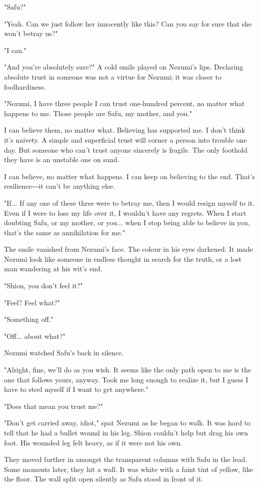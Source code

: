 "Safu?"

"Yeah. Can we just follow her innocently like this? Can you say for sure
that she won't betray us?"

"I can."

"And you're absolutely sure?" A cold smile played on Nezumi's lips.
Declaring absolute trust in someone was not a virtue for Nezumi; it was
closer to foolhardiness.

"Nezumi, I have three people I can trust one-hundred percent, no matter
what happens to me. Those people are Safu, my mother, and you."

I can believe them, no matter what. Believing has supported me. I don't
think it's naivety. A simple and superficial trust will corner a person
into trouble one day. But someone who can't trust anyone sincerely is
fragile. The only foothold they have is an unstable one on sand.

I can believe, no matter what happens. I can keep on believing to the
end. That's resilience―it can't be anything else.

"If... If any one of these three were to betray me, then I would resign
myself to it. Even if I were to lose my life over it, I wouldn't have
any regrets. When I start doubting Safu, or my mother, or you... when I
stop being able to believe in you, that's the same as annihilation for
me."

The smile vanished from Nezumi's face. The colour in his eyes darkened.
It made Nezumi look like someone in endless thought in search for the
truth, or a lost man wandering at his wit's end.

"Shion, you don't feel it?"

"Feel? Feel what?"

"Something off."

"Off... about what?"

Nezumi watched Safu's back in silence.

"Alright, fine, we'll do as you wish. It seems like the only path open
to me is the one that follows yours, anyway. Took me long enough to
realize it, but I guess I have to steel myself if I want to get
anywhere."

"Does that mean you trust me?"

"Don't get carried away, idiot," spat Nezumi as he began to walk. It was
hard to tell that he had a bullet wound in his leg. Shion couldn't help
but drag his own foot. His wounded leg felt heavy, as if it were not his
own.

They moved further in amongst the transparent columns with Safu in the
lead. Some moments later, they hit a wall. It was white with a faint
tint of yellow, like the floor. The wall split open silently as Safu
stood in front of it.


